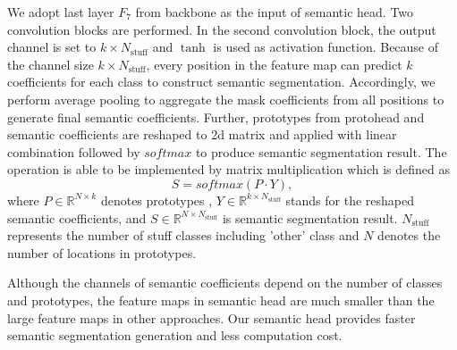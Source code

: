 \documentclass[runningheads]{llncs}
\begin{document}
We adopt last layer $F_7$ from backbone as the input of semantic head. Two convolution blocks are performed. In the second convolution block, the output channel is set to $k\times N_{\text{stuff}}$ and $\tanh$ is used as activation function. Because of the channel size $k\times N_{\text{stuff}}$, every position in the feature map can predict $k$ coefficients for each class to construct semantic segmentation. Accordingly, we perform average pooling to aggregate the mask coefficients from all positions to generate final semantic coefficients. Further, prototypes from protohead and semantic coefficients are reshaped to 2d matrix and applied with linear combination followed by $softmax$ to produce semantic segmentation result. The operation is able to be implemented by matrix multiplication which is defined as
\begin{equation}
S = softmax(P\cdot Y),
\end{equation}
where $P\in \mathbb{R}^{N\times k}$ denotes prototypes , $Y \in \mathbb{R}^{k\times N_{\text{stuff}}}$ stands for the reshaped semantic coefficients, and $S \in \mathbb{R}^{N \times N_{\text{stuff}}}$ is semantic segmentation result. $N_{\text{stuff}}$ represents the number of stuff classes including 'other' class and $N$ denotes the number of locations in prototypes.

Although the channels of semantic coefficients depend on the number of classes and prototypes, the feature maps in semantic head are much smaller than the large feature maps in other approaches. Our semantic head provides faster semantic segmentation generation and less computation cost.
\end{document}
